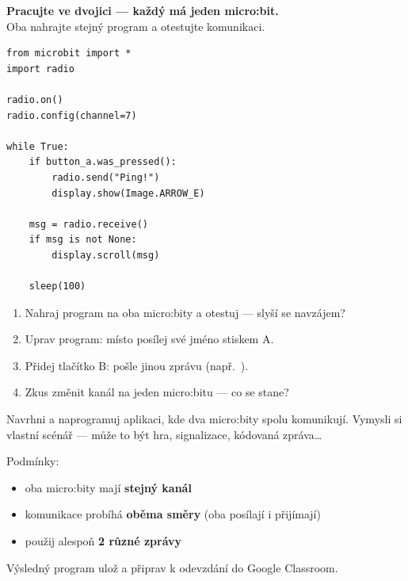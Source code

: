 \begin{ukol}

\textbf{Pracujte ve dvojici — každý má jeden micro:bit.}\\
Oba nahrajte stejný program a otestujte komunikaci.

\begin{lstlisting}
from microbit import *
import radio

radio.on()
radio.config(channel=7)

while True:
    if button_a.was_pressed():
        radio.send("Ping!")
        display.show(Image.ARROW_E)

    msg = radio.receive()
    if msg is not None:
        display.scroll(msg)

    sleep(100)
\end{lstlisting}

\begin{enumerate}
  \item Nahraj program na oba micro:bity a otestuj — slyší se navzájem?
  \item Uprav program: místo  posílej své jméno stiskem A.
  \item Přidej tlačítko B: pošle jinou zprávu (např.\ ).
  \item Zkus změnit kanál na jeden micro:bitu — co se stane?
\end{enumerate}

\odpoved[2cm]

\end{ukol}

\begin{ukol}

Navrhni a naprogramuj aplikaci, kde dva micro:bity spolu komunikují.
Vymysli si vlastní scénář — může to být hra, signalizace, kódovaná zpráva\ldots

\medskip
Podmínky:
\begin{itemize}
  \item oba micro:bity mají \textbf{stejný kanál}
  \item komunikace probíhá \textbf{oběma směry} (oba posílají i přijímají)
  \item použij alespoň \textbf{2 různé zprávy}
\end{itemize}

\odpoved[5cm]

\noindent Výsledný program ulož a připrav k odevzdání do Google Classroom.

\end{ukol}

